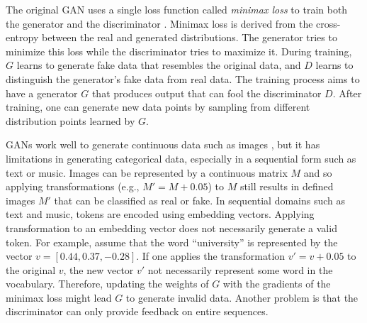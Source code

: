 The original GAN uses a single loss function called \textit{minimax loss} to train both the generator and the discriminator \cite{goodfellow2014generative}. Minimax loss is derived from the cross-entropy between the real and generated distributions. The generator tries to minimize this loss while the discriminator tries to maximize it.
%
During training, $G$ learns to generate fake data that resembles the original data, and $D$ learns to distinguish the generator's fake data from real data. The training process aims to have a generator $G$ that produces output that can fool the discriminator $D$. After training, one can generate new data points by sampling from different distribution points learned by $G$.

GANs work well to generate continuous data such as images \cite{brock2018large}, but it has limitations in generating categorical data, especially in a sequential form such as text or music. Images can be represented by a continuous matrix $M$ and so applying transformations (e.g., $M' = M + 0.05$) to $M$ still results in defined images $M'$ that can be classified as real or fake. In sequential domains such as text and music, tokens are encoded using embedding vectors. Applying transformation to an embedding vector does not necessarily generate a valid token. For example, assume that the word ``university'' is represented by the vector $v = [0.44, 0.37, -0.28]$. If one applies the transformation $v' = v + 0.05$ to the original $v$, the new vector $v'$ not necessarily represent some word in the vocabulary. Therefore, updating the weights of $G$ with the gradients of the minimax loss might lead $G$ to generate invalid data. Another problem is that the discriminator can only provide feedback on entire sequences.

